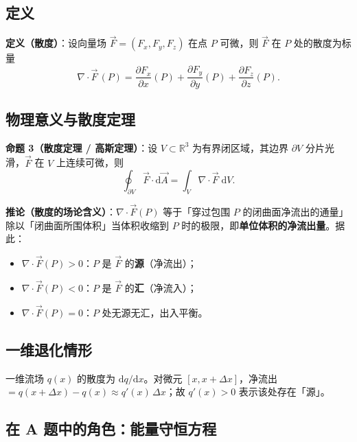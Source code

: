 \documentclass[12pt,a4paper]{ctexart}
\begin{document}
\subsection{定义}
\label{def:div}

\textbf{定义（散度）}：设向量场 $\vec{F}=(F_x,F_y,F_z)$ 在点 $P$ 可微，则 $\vec{F}$ 在 $P$ 处的散度为标量
\begin{equation}
\nabla\cdot\vec{F}\,(P)=\frac{\partial F_x}{\partial x}(P)+\frac{\partial F_y}{\partial y}(P)+\frac{\partial F_z}{\partial z}(P).
\label{eq:div}
\end{equation}

\subsection{物理意义与散度定理}

\textbf{命题 3（散度定理 / 高斯定理）}：设 $V\subset\mathbb{R}^3$ 为有界闭区域，其边界 $\partial V$ 分片光滑，$\vec{F}$ 在 $V$ 上连续可微，则
\begin{equation}
\oint_{\partial V}\vec{F}\cdot\mathrm{d}\vec{A}=\int_V \nabla\cdot\vec{F}\;\mathrm{d}V.
\end{equation}

\textbf{推论（散度的场论含义）}：$\nabla\cdot\vec{F}(P)$ 等于「穿过包围 $P$ 的闭曲面净流出的通量」除以「闭曲面所围体积」当体积收缩到 $P$ 时的极限，即\textbf{单位体积的净流出量}。据此：
\begin{itemize}[leftmargin=2.5em]
\item $\nabla\cdot\vec{F}(P)>0$：$P$ 是 $\vec{F}$ 的\textbf{源}（净流出）；
\item $\nabla\cdot\vec{F}(P)<0$：$P$ 是 $\vec{F}$ 的\textbf{汇}（净流入）；
\item $\nabla\cdot\vec{F}(P)=0$：$P$ 处无源无汇，出入平衡。
\end{itemize}

\subsection{一维退化情形}

一维流场 $q(x)$ 的散度为 $\mathrm{d}q/\mathrm{d}x$。对微元 $[x,x+\Delta x]$，净流出 $=q(x+\Delta x)-q(x)\approx q'(x)\,\Delta x$；故 $q'(x)>0$ 表示该处存在「源」。

\subsection{在 A 题中的角色：能量守恒方程}
\end{document}

